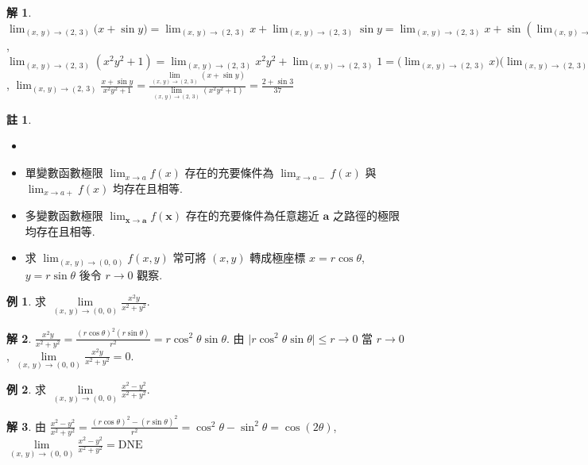 \documentclass[12pt]{extarticle}
\newcommand{\ds}{\displaystyle}
\theoremstyle{definition}
\newtheorem*{ex}{例}
\newtheorem*{sol}{解}
\newtheorem*{rmk}{註}
\newcommand{\va}{\mathbf{a}}
\newcommand{\vx}{\mathbf{x}}
\begin{document}
\begin{sol}
  $\ds\lim_{(x,\,y)\to (2,\,3)}\big(x + \sin y\big) = \lim_{(x,\,y)\to (2,\,3)}x + \lim_{(x,\,y)\to (2,\,3)}\sin y = \lim_{(x,\,y)\to (2,\,3)}x + \sin\left(\lim_{(x,\,y)\to (2,\,3)} y\right) = 2 + \sin 3$, $\ds\lim_{(x,\,y)\to (2,\,3)}\left(x^2 y^2 + 1\right) = \lim_{(x,\,y)\to (2,\,3)}x^2 y^2 + \lim_{(x,\,y)\to (2,\,3)}1 = \Big(\lim_{(x,\,y)\to (2,\,3)}x\Big)\Big(\lim_{(x,\,y)\to (2,\,3)}x\Big)\Big(\lim_{(x,\,y)\to (2,\,3)}y\Big)\Big(\lim_{(x,\,y)\to (2,\,3)}y\Big) + 1 = 2^2 3^2 + 1 = 37$, $\ds\lim_{(x,\,y)\to (2,\,3)}\frac{x + \sin y}{x^2 y^2 + 1} = \frac{\lim\limits_{(x,\,y)\to (2,\,3)}(x + \sin y)}{\lim\limits_{(x,\,y)\to (2,\,3)}(x^2 y^2 + 1)} = \frac{2 + \sin 3}{37}$
\end{sol}

\begin{rmk}
  \begin{itemize}\setlength{\itemsep}{0pt}
    \item[]
    \item 單變數函數極限 $\ds\lim_{x\to a} f(x)$ 存在的充要條件為 $\ds\lim_{x\to a-} f(x)$ 與 $\ds\lim_{x\to a+} f(x)$ 均存在且相等. 
    \item 多變數函數極限 $\ds\lim_{\vx\to\va} f(\vx)$ 存在的充要條件為{\color{M4}任意趨近 $\va$ 之路徑的極限}均存在且相等. 
    \item 求 $\ds\lim_{(x,\,y)\to(0,\,0)}f(x, y)$ 常可將 $(x,y)$ 轉成極座標 $\ds x = r\cos\theta$, $\ds y = r\sin\theta$ 後令 $r\to 0$ 觀察. 
  \end{itemize}

\end{rmk}

\begin{ex}
  求 $\ds\lim\limits_{(x,\,y)\to (0,\,0)}\frac{x^2y}{x^2+y^2}$. 
\end{ex}
\begin{sol}
  $\ds\frac{x^2y}{x^2+y^2} =\frac{(r\cos\theta)^2(r\sin\theta)}{r^2} = r\cos^2\theta\sin\theta$. 由 $\ds\big|r\cos^2\theta\sin\theta\big|\leqslant r\to 0$ 當 $r\to 0$, $\ds\lim\limits_{(x,\,y)\to (0,\,0)}\frac{x^2 y}{x^2 + y^2} = 0$. 
\end{sol}

\begin{ex}
  求 $\ds\lim\limits_{(x,\,y)\to (0,\,0)}\frac{x^2 - y^2}{x^2 + y^2}$. 
\end{ex}
\begin{sol}
  由 $\ds\frac{x^2 - y^2}{x^2 + y^2} = \frac{(r\cos\theta)^2 - (r\sin\theta)^2}{r^2} = \cos^2\theta - \sin^2\theta = \cos(2\theta)$, $\ds\lim\limits_{(x,\,y)\to (0,\,0)}\frac{x^2 - y^2}{x^2 + y^2} = \text{DNE}$
\end{sol}
\end{document}
